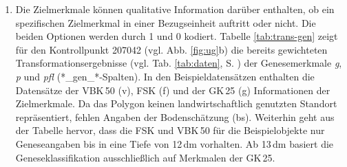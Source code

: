 \begin{enumerate}
\item Die Zielmerkmale können qualitative Information darüber enthalten, ob ein spezifischen Zielmerkmal in einer Bezugseinheit auftritt oder nicht. Die beiden Optionen werden durch 1 und 0 kodiert. Tabelle \ref{tab:trans-gen} zeigt für den Kontrollpunkt 207042 (vgl. Abb. \ref{fig:ug}b) die bereits gewichteten Transformationsergebnisse (vgl. Tab. \ref{tab:daten}, S. \pageref{tab:daten}) der Genesemerkmale \textit{g}, \textit{p} und \textit{pfl} (*\_gen\_*-Spalten). In den Beispieldatensätzen enthalten die Datensätze der VBK\,50 (v), FSK (f) und der GK\,25 (g) Informationen der Zielmerkmale. Da das Polygon keinen landwirtschaftlich genutzten Standort repräsentiert, fehlen Angaben der Bodenschätzung (bs). Weiterhin geht aus der Tabelle hervor, dass die FSK und VBK\,50 für die Beispielobjekte nur Geneseangaben bis in eine Tiefe von 12\,dm vorhalten. Ab 13\,dm basiert die Geneseklassifikation ausschließlich auf Merkmalen der GK\,25. 


\end{enumerate}
